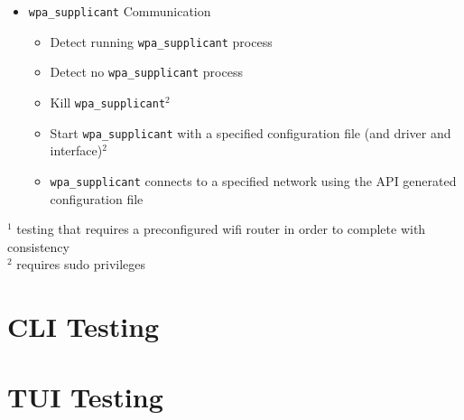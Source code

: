 \documentclass[11pt]{article}
\begin{document}
\begin{itemize}
  \item \texttt{wpa\_supplicant} Communication
  \begin{itemize}
    \item Detect running \texttt{wpa\_supplicant} process
    \item Detect no \texttt{wpa\_supplicant} process
    \item Kill \texttt{wpa\_supplicant}$^2$
    \item Start \texttt{wpa\_supplicant} with a specified configuration file (and driver and interface)$^2$
    \item \texttt{wpa\_supplicant} connects to a specified network using the API generated configuration file
  \end{itemize}

\end{itemize}

\small$^1$ testing that requires a preconfigured wifi router in order to complete with consistency\\
\small$^2$ requires sudo privileges

\section{CLI Testing}


\section{TUI Testing}
\end{document}

